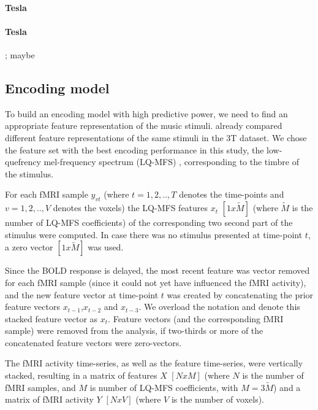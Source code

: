 \paragraph{\unit[3]{Tesla}}
\paragraph{\unit[7]{Tesla}}

\citet{HDH+2015}; maybe \citet{HBI+14}

\subsection*{Encoding model}


To build an encoding model with high predictive power, we need to find an
appropriate feature representation of the music stimuli.  \citet{CTK+2012}
already compared different feature representations of the same stimuli in the
3T dataset. We chose the feature set with the best encoding performance in this
study, the low-quefrency mel-frequency spectrum (LQ-MFS) \citep{HDH+2015},
corresponding to the timbre of the stimulus. 




For each f{MRI} sample $y_{vt}$ (where $t=1,2,..,T$ denotes the time-points and
$v=1,2,..,V$ denotes the voxels) the LQ-MFS features $x_{t}$ $[1x\widetilde{M}]$
(where $\widetilde{M}$ is the number of LQ-MFS coefficients) of the
corresponding two second part of the stimulus were computed. In case there was
no stimulus presented at time-point $t$, a zero vector $[1x\widetilde{M}]$ was
used. 

Since the BOLD response is delayed,  the most recent feature was vector removed
for each f{MRI} sample (since it could not yet have influenced the f{MRI}
activity), and the new feature vector at time-point $t$ was created by
concatenating the prior feature vectors $x_{t-1}$,$x_{t-2}$ and $x_{t-3}$. We
overload the notation and denote this stacked feature vector as $x_{t}$.
Feature vectors (and the corresponding f{MRI} sample) were removed from the
analysis, if two-thirds or more of the concatenated feature vectors were
zero-vectors.

The f{MRI} activity time-series, as well as the feature time-series, were
vertically stacked, resulting in a matrix of features $X$ $[NxM]$ (where $N$ is
the number of f{MRI} samples, and $M$ is number of LQ-MFS coefficients, with
$M=3\widetilde{M}$) and a matrix of f{MRI} activity $Y$ $[NxV]$ (where $V$ is
the number of voxels).

